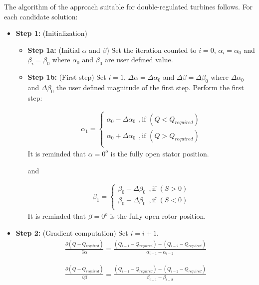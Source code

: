 The algorithm of the approach suitable for double-regulated turbines follows.
For each candidate solution:
\begin{itemize}
\item[]{\bf Step 1:}  (Initialization) 
\begin{itemize}
	\item[]{\bf Step 1a:} (Initial $\alpha$ and $\beta$) Set the iteration counted to $i=0$, $\alpha_i=\alpha _0$ and $\beta_i=\beta _0$ where $\alpha _0$ and $\beta _0$ are user defined value.
	\item[]{\bf Step 1b:} (First step) Set $i=1$, $\Delta \alpha= \Delta \alpha_0$ and $\Delta \beta= \Delta \beta_0$ where $\Delta \alpha_0$ and $\Delta \beta_0$ the user defined magnitude of the first step. Perform the first step:

\begin{eqnarray}
	\alpha_1={\left\{ 
	\begin{array}{ll}
    \alpha_0 - \Delta \alpha_0 ~~,\mbox{if $(Q < Q_{required})$}\\
	\alpha_0 + \Delta \alpha_0 ~~,\mbox{if $(Q > Q_{required})$}\\
    \end{array} \right. }
    \label{step0}
\end{eqnarray}  
It is reminded that $\alpha=0^o$ is the fully open stator position.

and 

\begin{eqnarray}
	\beta_1={\left\{ 
	\begin{array}{ll}
    \beta_0 - \Delta \beta_0 ~~,\mbox{if $(S > 0)$}\\
	\beta_0 + \Delta \beta_0 ~~,\mbox{if $(S < 0)$}\\
    \end{array} \right. }
    \label{step0}
\end{eqnarray}  
It is reminded that $\beta=0^o$ is the fully open rotor position.


\end{itemize}

\item[]{\bf Step 2:}  (Gradient computation) Set $i=i+1$. 
\begin{eqnarray}
	\frac{\partial(Q-Q_{required})}{\partial \alpha}=\frac{(Q_{i-1}-Q_{required})-(Q_{i-2}-Q_{required})}{\alpha_{i-1}- \alpha_{i-2}}
\end{eqnarray}  

\begin{eqnarray}
	\frac{\partial(Q-Q_{required})}{\partial \beta}=\frac{(Q_{i-1}-Q_{required})-(Q_{i-2}-Q_{required})}{\beta_{i-1}- \beta_{i-2}}
\end{eqnarray}  


\end{itemize}
